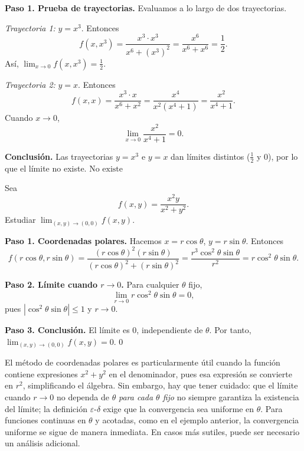 \begin{myproof}
\textbf{Paso 1. Prueba de trayectorias.} Evaluamos a lo largo de dos
trayectorias.

\textit{Trayectoria 1:} $y=x^3$. Entonces
\[
f(x,x^3) = \frac{x^3\cdot x^3}{x^6+(x^3)^2}
          = \frac{x^6}{x^6+x^6} = \frac{1}{2}.
\]
Así, $\lim_{x\to 0} f(x,x^3)=\frac12$.

\textit{Trayectoria 2:} $y=x$. Entonces
\[
f(x,x) = \frac{x^3\cdot x}{x^6+x^2}
        = \frac{x^4}{x^2(x^4+1)} = \frac{x^2}{x^4+1}.
\]
Cuando $x\to 0$,
\[
\lim_{x\to 0} \frac{x^2}{x^4+1} = 0.
\]

\textbf{Conclusión.} Las trayectorias $y=x^3$ e $y=x$ dan límites
distintos ($\frac12$ y $0$), por lo que el límite no existe.
$\boxed{\text{No existe}}$
\end{myproof}

\begin{example}
Sea
\[
f(x,y) = \frac{x^2 y}{x^2 + y^2}.
\]
Estudiar $\lim_{(x,y)\to(0,0)} f(x,y)$.
\end{example}

\begin{myproof}
\textbf{Paso 1. Coordenadas polares.} Hacemos $x=r\cos\theta$,
$y=r\sin\theta$. Entonces
\[
f(r\cos\theta, r\sin\theta)
= \frac{(r\cos\theta)^2(r\sin\theta)}
       {(r\cos\theta)^2+(r\sin\theta)^2}
= \frac{r^3\cos^2\theta\sin\theta}{r^2}
= r\cos^2\theta\sin\theta.
\]

\textbf{Paso 2. Límite cuando $r\to 0$.}
Para cualquier $\theta$ fijo,
\[
\lim_{r\to 0} r\cos^2\theta\sin\theta = 0,
\]
pues $|\cos^2\theta\sin\theta| \leq 1$ y $r\to 0$.

\textbf{Paso 3. Conclusión.}
El límite es $0$, independiente de $\theta$. Por tanto,
$\displaystyle \lim_{(x,y)\to(0,0)} f(x,y) = 0$.
$\boxed{0}$
\end{myproof}

\begin{rem}
El método de coordenadas polares es particularmente útil cuando la
función contiene expresiones $x^2+y^2$ en el denominador, pues esa
expresión se convierte en $r^2$, simplificando el álgebra. Sin
embargo, hay que tener cuidado: que el límite cuando $r\to 0$ no
dependa de $\theta$ \emph{para cada $\theta$ fijo} no siempre
garantiza la existencia del límite; la definición $\varepsilon$-$\delta$
exige que la convergencia sea uniforme en $\theta$. Para funciones
continuas en $\theta$ y acotadas, como en el ejemplo anterior, la
convergencia uniforme se sigue de manera inmediata. En casos más
sutiles, puede ser necesario un análisis adicional.
\end{rem}


